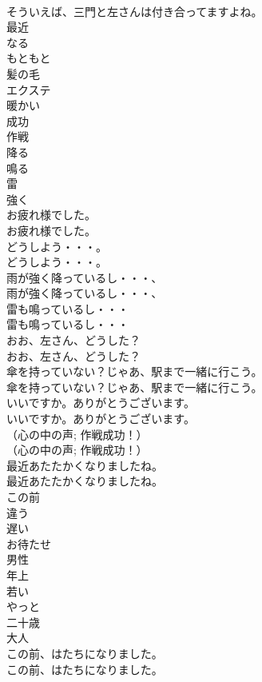 \documentclass[8pt]{extreport}
\begin{document}
\begin{CJK}{UTF8}{min}
\\	そういえば、三門と左さんは付き合ってますよね。 
\\	最近
\\	なる
\\	もともと
\\	髪の毛
\\	エクステ
\\	暖かい
\\	成功
\\	作戦
\\	降る
\\	鳴る
\\	雷
\\	強く
\\	お疲れ様でした。	
\\	お疲れ様でした。 
\\	どうしよう・・・。	
\\	どうしよう・・・。 
\\	雨が強く降っているし・・・、	
\\	雨が強く降っているし・・・、 
\\	雷も鳴っているし・・・	
\\	雷も鳴っているし・・・　 
\\	おお、左さん、どうした？	
\\	おお、左さん、どうした？ 
\\	傘を持っていない？じゃあ、駅まで一緒に行こう。	
\\	傘を持っていない？じゃあ、駅まで一緒に行こう。 
\\	いいですか。ありがとうございます。	
\\	いいですか。ありがとうございます。 
\\	（心の中の声; 作戦成功！）	
\\	（心の中の声; 作戦成功！） 
\\	最近あたたかくなりましたね。	
\\	最近あたたかくなりましたね。 
\\	この前
\\	違う
\\	遅い
\\	お待たせ
\\	男性
\\	年上
\\	若い
\\	やっと
\\	二十歳
\\	大人
\\	この前、はたちになりました。	
\\	この前、はたちになりました。 

\end{CJK}
\end{document}
